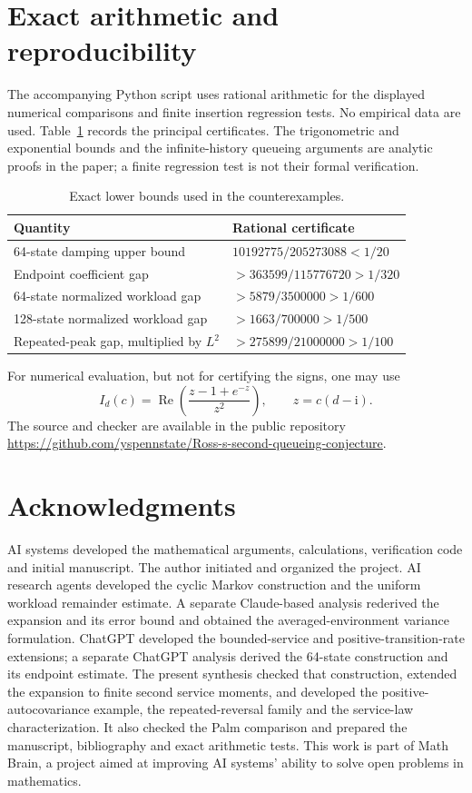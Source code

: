 \documentclass[11pt,reqno]{amsart}
\numberwithin{equation}{section}
\theoremstyle{plain}
\theoremstyle{definition}
\newcommand{\1}{\mathbf 1}
\newcommand{\ii}{\mathrm i}
\DeclareMathOperator{\Rea}{Re}
\begin{document}
\section{Exact arithmetic and reproducibility}\label{app:check}
The accompanying Python script uses rational arithmetic for the displayed numerical comparisons and finite insertion regression tests. No empirical data are used. Table~\ref{tab:constants} records the principal certificates. The trigonometric and exponential bounds and the infinite-history queueing arguments are analytic proofs in the paper; a finite regression test is not their formal verification.
\begin{table}[ht]
\caption{Exact lower bounds used in the counterexamples.}\label{tab:constants}
\centering
\begin{tabular}{@{}ll@{}}
\toprule
Quantity & Rational certificate\\
\midrule
64-state damping upper bound & $10192775/205273088<1/20$\\
Endpoint coefficient gap & $>363599/115776720>1/320$\\
64-state normalized workload gap & $>5879/3500000>1/600$\\
128-state normalized workload gap & $>1663/700000>1/500$\\
Repeated-peak gap, multiplied by $L^2$ & $>275899/21000000>1/100$\\
\bottomrule
\end{tabular}
\end{table}
For numerical evaluation, but not for certifying the signs, one may use
\[
 I_d(c)=\Rea\left(\frac{z-1+e^{-z}}{z^2}\right),\qquad z=c(d-\ii).
\]
The source and checker are available in the public repository
\url{https://github.com/yspennstate/Ross-s-second-queueing-conjecture}.


\section*{Acknowledgments}
AI systems developed the mathematical arguments, calculations, verification code and initial manuscript. The author initiated and organized the project. AI research agents developed the cyclic Markov construction and the uniform workload remainder estimate. A separate Claude-based analysis rederived the expansion and its error bound and obtained the averaged-environment variance formulation. ChatGPT developed the bounded-service and positive-transition-rate extensions; a separate ChatGPT analysis derived the 64-state construction and its endpoint estimate. The present synthesis checked that construction, extended the expansion to finite second service moments, and developed the positive-autocovariance example, the repeated-reversal family and the service-law characterization. It also checked the Palm comparison and prepared the manuscript, bibliography and exact arithmetic tests. This work is part of Math Brain, a project aimed at improving AI systems' ability to solve open problems in mathematics.
\end{document}
